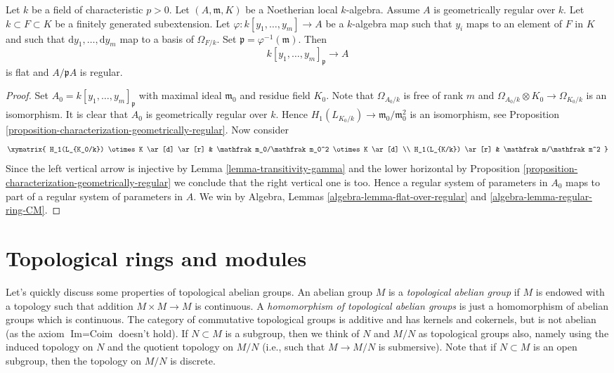 \begin{lemma}
\label{lemma-geometrically-regular-over-field}
Let $k$ be a field of characteristic $p > 0$. Let $(A, \mathfrak m, K)$
be a Noetherian local $k$-algebra. Assume $A$ is geometrically regular
over $k$. Let $k \subset F \subset K$ be a finitely generated subextension.
Let $\varphi : k[y_1, \ldots, y_m] \to A$ be a $k$-algebra map
such that $y_i$ maps to an element of $F$ in $K$ and such that
$\text{d}y_1, \ldots, \text{d}y_m$ map to a basis of $\Omega_{F/k}$.
Set $\mathfrak p = \varphi^{-1}(\mathfrak m)$. Then
$$
k[y_1, \ldots, y_m]_\mathfrak p \to A
$$
is flat and $A/\mathfrak pA$ is regular.
\end{lemma}

\begin{proof}
Set $A_0 = k[y_1, \ldots, y_m]_\mathfrak p$ with maximal ideal
$\mathfrak m_0$ and residue field $K_0$. Note that
$\Omega_{A_0/k}$ is free of rank $m$ and
$\Omega_{A_0/k} \otimes K_0 \to \Omega_{K_0/k}$ is an isomorphism.
It is clear that $A_0$ is geometrically regular over $k$. Hence
$H_1(L_{K_0/k}) \to \mathfrak m_0/\mathfrak m_0^2$ is an isomorphism, see
Proposition \ref{proposition-characterization-geometrically-regular}.
Now consider
$$
\xymatrix{
H_1(L_{K_0/k}) \otimes K \ar[d] \ar[r] &
\mathfrak m_0/\mathfrak m_0^2 \otimes K \ar[d] \\
H_1(L_{K/k}) \ar[r] & \mathfrak m/\mathfrak m^2
}
$$
Since the left vertical arrow is injective by
Lemma \ref{lemma-transitivity-gamma}
and the lower horizontal by
Proposition \ref{proposition-characterization-geometrically-regular}
we conclude that the right vertical one is too.
Hence a regular system of parameters in $A_0$ maps to
part of a regular system of parameters in $A$.
We win by
Algebra, Lemmas \ref{algebra-lemma-flat-over-regular} and
\ref{algebra-lemma-regular-ring-CM}.
\end{proof}












\section{Topological rings and modules}
\label{section-topological-ring}

\noindent
Let's quickly discuss some properties of topological abelian groups.
An abelian group $M$ is a {\it topological abelian group} if $M$ is
endowed with a topology such that addition $M \times M \to M$ is
continuous. A {\it homomorphism of topological abelian groups}
is just a homomorphism of abelian groups which is continuous.
The category of commutative topological groups is additive and
has kernels and cokernels, but is not abelian (as the axiom
$\text{Im} = \text{Coim}$ doesn't hold). If $N \subset M$ is a
subgroup, then we think of $N$ and $M/N$ as topological groups
also, namely using the induced topology on $N$ and the quotient
topology on $M/N$ (i.e., such that $M \to M/N$ is submersive).
Note that if $N \subset M$ is an open subgroup, then the topology
on $M/N$ is discrete.

